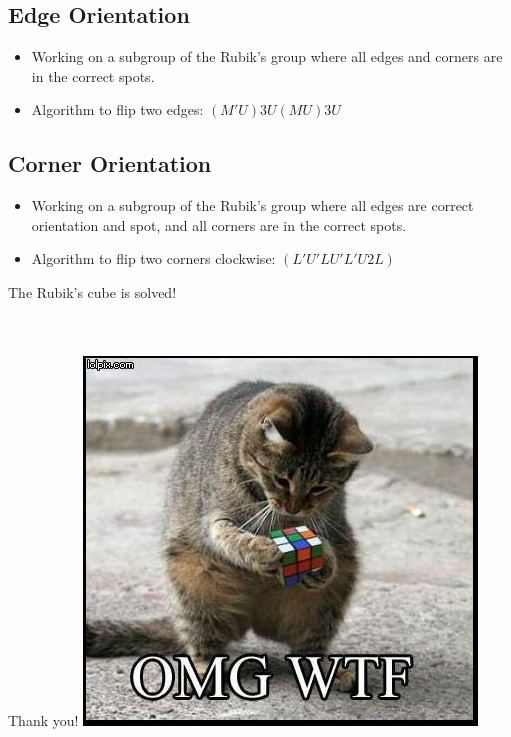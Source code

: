 \documentclass[xcolor=pdftex,dvipsnames,table]{beamer}
\begin{document}
\subsection{Edge Orientation}
\begin{frame}
  \begin{itemize}
    \item Working on a subgroup of the Rubik's group where all edges and corners are in the correct spots.
    \item Algorithm to flip two edges: $(M'U)3 U (MU)3 U$
  \end{itemize}
\end{frame}

\subsection{Corner Orientation}
\begin{frame}
  \begin{itemize}
    \item Working on a subgroup of the Rubik's group where all edges are correct orientation and spot, and all corners are in the correct spots.
    \item Algorithm to flip two corners clockwise: $(L' U' L U' L' U2 L)$
  \end{itemize}
  The Rubik's cube is solved!
\end{frame}

\section{}
\begin{frame}
  \begin{columns}[cc]
    \column{1.5in}
    Thank you!
    \column{1.5in}
    \includegraphics[scale=0.5]{catcube.jpg}
  \end{columns}
\end{frame}
\end{document}
